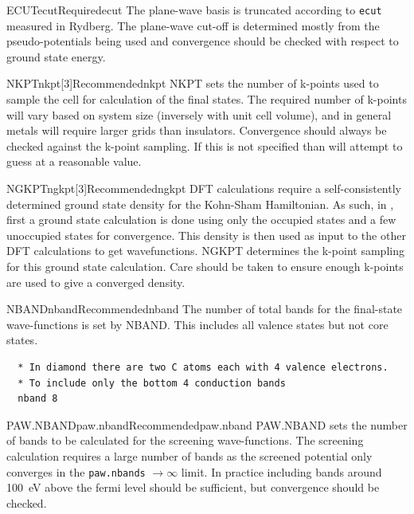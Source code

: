 \documentclass[11pt]{report}
\begin{document}
\begin{Card}{ECUT}{ecut}{Required}{ecut}
The plane-wave basis is truncated according to \texttt{ecut} measured in Rydberg. The plane-wave cut-off is determined mostly from the pseudo-potentials being used and convergence should be checked with respect to ground state energy.
\end{Card}

\begin{Card}{NKPT}{nkpt[3]}{Recommended}{nkpt}
NKPT sets the number of k-points used to sample the cell for calculation of the final states. The required number of k-points will vary based on system size (inversely with unit cell volume), and in general metals will require larger grids than insulators. Convergence should always be checked against the k-point sampling. If this is not specified than  will attempt to guess at a reasonable value. 
\end{Card}

\begin{Card}{NGKPT}{ngkpt[3]}{Recommended}{ngkpt}
DFT calculations require a self-consistently determined ground state density for the Kohn-Sham Hamiltonian. As such, in , first a ground state calculation is done using only the occupied states and a few unoccupied states for convergence. This density is then used as input to the other DFT calculations to get wavefunctions. NGKPT determines the k-point sampling for this ground state calculation. Care should be taken to ensure enough k-points are used to give a converged density.
\end{Card}

\begin{Card}{NBAND}{nband}{Recommended}{nband}
The number of total bands for the final-state wave-functions is set by NBAND. This includes all valence states but not core states.
\begin{verbatim}
  * In diamond there are two C atoms each with 4 valence electrons.
  * To include only the bottom 4 conduction bands
  nband 8
\end{verbatim}
\end{Card}

\begin{Card}{PAW.NBAND}{paw.nband}{Recommended}{paw.nband}
PAW.NBAND sets the number of bands to be calculated for the screening wave-functions. The screening calculation requires a large number of bands as the screened potential only converges in the \texttt{paw.nbands} $\rightarrow \infty$ limit. In practice including bands around 100~eV above the fermi level should be sufficient, but convergence should be checked. 
\end{Card}
\end{document}
